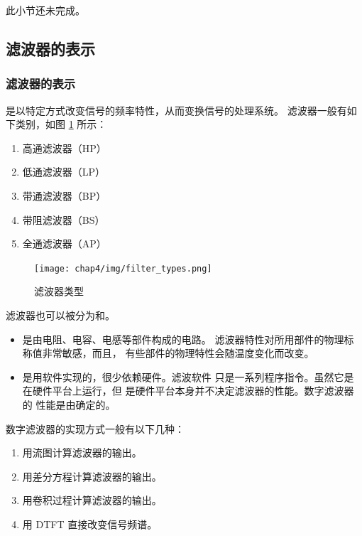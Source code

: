 \begin{note}
    此小节还未完成。
\end{note}

\subsection{滤波器的表示}

\subsubsection{滤波器的表示}

\begin{definition}
    是以特定方式改变信号的频率特性，从而变换信号的处理系统。
    滤波器一般有如下类别，如图 \ref{fig:filter-types} 所示：
    \begin{enumerate}[label=(\arabic*)]
        \item 高通滤波器（HP）
        \item 低通滤波器（LP）
        \item 带通滤波器（BP）
        \item 带阻滤波器（BS）
        \item 全通滤波器（AP）
    \end{enumerate}
    \begin{figure}[H]
        \centering
        \texttt{[image: chap4/img/filter\_types.png]}
        \caption{滤波器类型}
        \label{fig:filter-types}
    \end{figure}

    滤波器也可以被分为和。
    \begin{itemize}
        \item {}是由电阻、电容、电感等部件构成的电路。
            滤波器特性对所用部件的物理标称值非常敏感，而且，
            有些部件的物理特性会随温度变化而改变。
        \item {}是用软件实现的，很少依赖硬件。滤波软件
            只是一系列程序指令。虽然它是在硬件平台上运行，但
            是硬件平台本身并不决定滤波器的性能。数字滤波器的
            性能是由确定的。
    \end{itemize}
    数字滤波器的实现方式一般有以下几种：
    \begin{enumerate}
        \item 用流图计算滤波器的输出。
        \item 用差分方程计算滤波器的输出。
        \item 用卷积过程计算滤波器的输出。
        \item 用 DTFT 直接改变信号频谱。
    \end{enumerate}
\end{definition}


